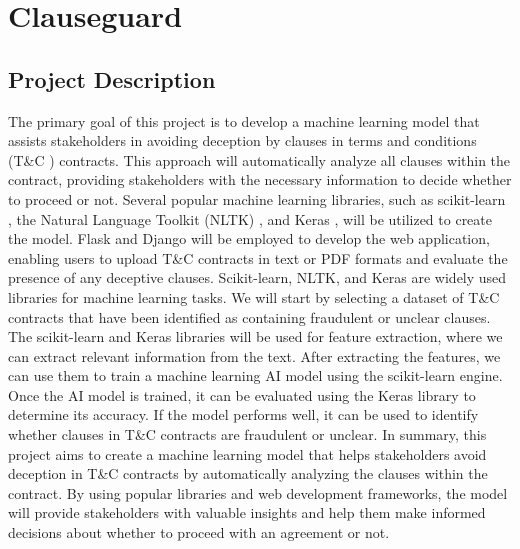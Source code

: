 \chapter{Clauseguard \\
\label{Chapter::clauseGuard}}

\section{Project Description\label{Section::Project Chosen}}
The primary goal of this project is to develop a machine learning model that assists stakeholders in avoiding deception by clauses in terms and conditions (T\&C ) contracts. This approach will automatically analyze all clauses within the contract, providing stakeholders with the necessary information to decide whether to proceed or not.
Several popular machine learning libraries, such as scikit-learn \cite{scikit-learn}, the Natural Language Toolkit (NLTK) \cite{nltk}, and Keras \cite{keras}, will be utilized to create the model. Flask \cite{flask} and Django \cite{django} will be employed to develop the web application, enabling users to upload T\&C contracts in text or PDF formats and evaluate the presence of any deceptive clauses. Scikit-learn, NLTK, and Keras are widely used libraries for machine learning tasks.
We will start by selecting a dataset of T\&C contracts that have been identified as containing fraudulent or unclear clauses. The scikit-learn and Keras libraries will be used for feature extraction, where we can extract relevant information from the text. After extracting the features, we can use them to train a machine learning AI model using the scikit-learn engine.
Once the AI model is trained, it can be evaluated using the Keras library to determine its accuracy. If the model performs well, it can be used to identify whether clauses in T\&C contracts are fraudulent or unclear.
In summary, this project aims to create a machine learning model that helps stakeholders avoid deception in T\&C contracts by automatically analyzing the clauses within the contract. By using popular libraries and web development frameworks, the model will provide stakeholders with valuable insights and help them make informed decisions about whether to proceed with an agreement or not.

